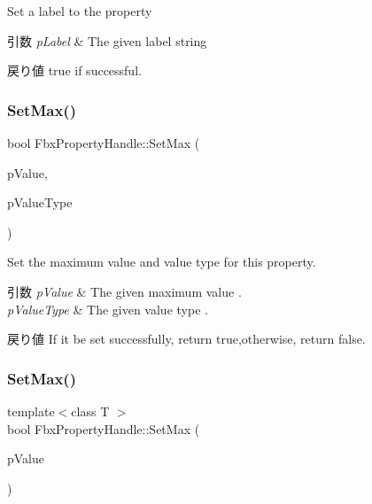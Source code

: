 Set a label to the property 
\begin{DoxyParams}{引数}
{\em p\+Label} & The given label string \\
\hline
\end{DoxyParams}
\begin{DoxyReturn}{戻り値}
{\ttfamily true} if successful. 
\end{DoxyReturn}
\mbox{\label{class_fbx_property_handle_a5e41a6d59cd7a1b1c0325b7cf4476285}} 
\subsubsection{\texorpdfstring{Set\+Max()}{SetMax()}\hspace{0.1cm}{\footnotesize\ttfamily [1/2]}}
{\footnotesize\ttfamily bool Fbx\+Property\+Handle\+::\+Set\+Max (\begin{DoxyParamCaption}\item[{const void $\ast$}]{p\+Value,  }\item[{\hyperlink{fbxpropertytypes_8h_a73913a5ddfb20e57c6f25e9e6784bd92}{E\+Fbx\+Type}}]{p\+Value\+Type }\end{DoxyParamCaption})}

Set the maximum value and value type for this property. 
\begin{DoxyParams}{引数}
{\em p\+Value} & The given maximum value . \\
\hline
{\em p\+Value\+Type} & The given value type . \\
\hline
\end{DoxyParams}
\begin{DoxyReturn}{戻り値}
If it be set successfully, return true,otherwise, return false. 
\end{DoxyReturn}
\mbox{\label{class_fbx_property_handle_abda2411b3b6fb98963c1009b3c2e1425}} 
\subsubsection{\texorpdfstring{Set\+Max()}{SetMax()}\hspace{0.1cm}{\footnotesize\ttfamily [2/2]}}
{\footnotesize\ttfamily template$<$class T $>$ \\
bool Fbx\+Property\+Handle\+::\+Set\+Max (\begin{DoxyParamCaption}\item[{const T \&}]{p\+Value }\end{DoxyParamCaption})}

